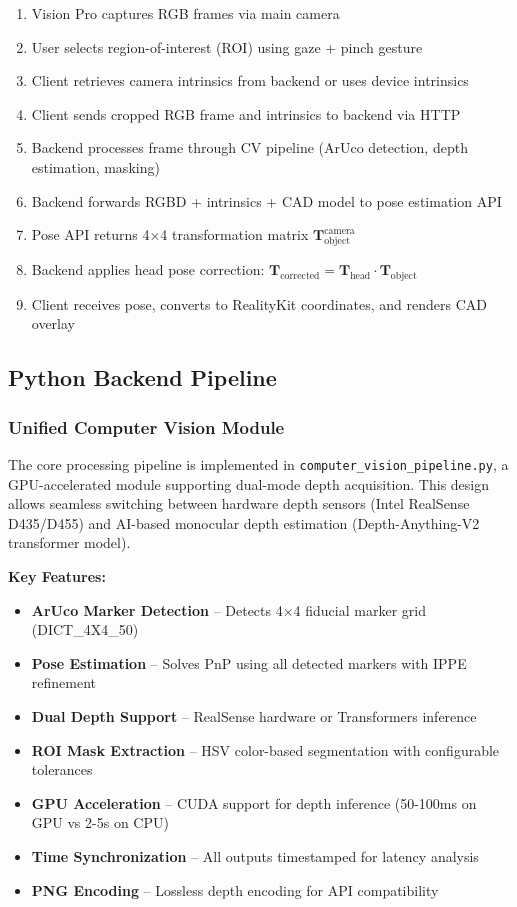 \begin{enumerate}
    \item Vision Pro captures RGB frames via main camera
    \item User selects region-of-interest (ROI) using gaze + pinch gesture
    \item Client retrieves camera intrinsics from backend or uses device intrinsics
    \item Client sends cropped RGB frame and intrinsics to backend via HTTP
    \item Backend processes frame through CV pipeline (ArUco detection, depth estimation, masking)
    \item Backend forwards RGBD + intrinsics + CAD model to pose estimation API
    \item Pose API returns 4×4 transformation matrix $\mathbf{T}_{\text{object}}^{\text{camera}}$
    \item Backend applies head pose correction: $\mathbf{T}_{\text{corrected}} = \mathbf{T}_{\text{head}} \cdot \mathbf{T}_{\text{object}}$
    \item Client receives pose, converts to RealityKit coordinates, and renders CAD overlay
\end{enumerate}

\subsection{Python Backend Pipeline}

\subsubsection{Unified Computer Vision Module}

The core processing pipeline is implemented in \texttt{computer\_vision\_pipeline.py}, a GPU-accelerated module supporting dual-mode depth acquisition. This design allows seamless switching between hardware depth sensors (Intel RealSense D435/D455) and AI-based monocular depth estimation (Depth-Anything-V2 transformer model).

\textbf{Key Features:}
\begin{itemize}
    \item \textbf{ArUco Marker Detection} -- Detects 4×4 fiducial marker grid (DICT\_4X4\_50)
    \item \textbf{Pose Estimation} -- Solves PnP using all detected markers with IPPE refinement
    \item \textbf{Dual Depth Support} -- RealSense hardware or Transformers inference
    \item \textbf{ROI Mask Extraction} -- HSV color-based segmentation with configurable tolerances
    \item \textbf{GPU Acceleration} -- CUDA support for depth inference (50-100ms on GPU vs 2-5s on CPU)
    \item \textbf{Time Synchronization} -- All outputs timestamped for latency analysis
    \item \textbf{PNG Encoding} -- Lossless depth encoding for API compatibility
\end{itemize}

